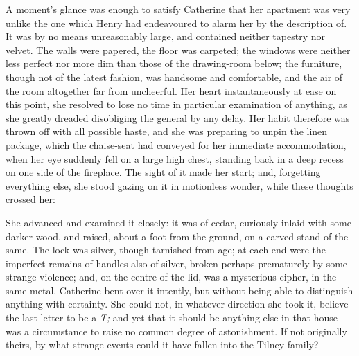 A moment's glance was enough to satisfy Catherine that her apartment was very unlike the one which Henry had endeavoured to alarm her by the description of. It was by no means unreasonably large, and contained neither tapestry nor velvet. The walls were papered, the floor was carpeted; the windows were neither less perfect nor more dim than those of the drawing-room below; the furniture, though not of the latest fashion, was handsome and comfortable, and the air of the room altogether far from uncheerful. Her heart instantaneously at ease on this point, she resolved to lose no time in particular examination of anything, as she greatly dreaded disobliging the general by any delay. Her habit therefore was thrown off with all possible haste, and she was preparing to unpin the linen package, which the chaise-seat had conveyed for her immediate accommodation, when her eye suddenly fell on a large high chest, standing back in a deep recess on one side of the fireplace. The sight of it made her start; and, forgetting everything else, she stood gazing on it in motionless wonder, while these thoughts crossed her:

 She advanced and examined it closely: it was of cedar, curiously inlaid with some darker wood, and raised, about a foot from the ground, on a carved stand of the same. The lock was silver, though tarnished from age; at each end were the imperfect remains of handles also of silver, broken perhaps prematurely by some strange violence; and, on the centre of the lid, was a mysterious cipher, in the same metal. Catherine bent over it intently, but without being able to distinguish anything with certainty. She could not, in whatever direction she took it, believe the last letter to be a {\em T;} and yet that it should be anything else in that house was a circumstance to raise no common degree of astonishment. If not originally theirs, by what strange events could it have fallen into the Tilney family?

